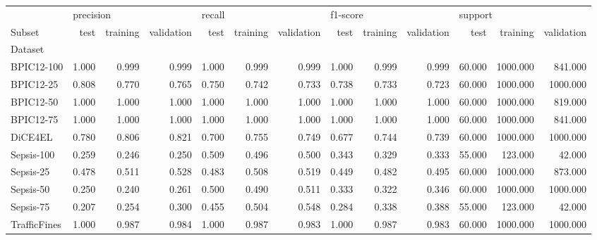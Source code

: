 \begin{tabular}{lrrrrrrrrrrrr}
\toprule
 & \multicolumn{3}{l}{precision} & \multicolumn{3}{l}{recall} & \multicolumn{3}{l}{f1-score} & \multicolumn{3}{l}{support} \\
Subset & test & training & validation & test & training & validation & test & training & validation & test & training & validation \\
Dataset &  &  &  &  &  &  &  &  &  &  &  &  \\
\midrule
BPIC12-100 & 1.000 & 0.999 & 0.999 & 1.000 & 0.999 & 0.999 & 1.000 & 0.999 & 0.999 & 60.000 & 1000.000 & 841.000 \\
BPIC12-25 & 0.808 & 0.770 & 0.765 & 0.750 & 0.742 & 0.733 & 0.738 & 0.733 & 0.723 & 60.000 & 1000.000 & 1000.000 \\
BPIC12-50 & 1.000 & 1.000 & 1.000 & 1.000 & 1.000 & 1.000 & 1.000 & 1.000 & 1.000 & 60.000 & 1000.000 & 819.000 \\
BPIC12-75 & 1.000 & 1.000 & 1.000 & 1.000 & 1.000 & 1.000 & 1.000 & 1.000 & 1.000 & 60.000 & 1000.000 & 841.000 \\
DiCE4EL & 0.780 & 0.806 & 0.821 & 0.700 & 0.755 & 0.749 & 0.677 & 0.744 & 0.739 & 60.000 & 1000.000 & 1000.000 \\
Sepsis-100 & 0.259 & 0.246 & 0.250 & 0.509 & 0.496 & 0.500 & 0.343 & 0.329 & 0.333 & 55.000 & 123.000 & 42.000 \\
Sepsis-25 & 0.478 & 0.511 & 0.528 & 0.483 & 0.508 & 0.519 & 0.449 & 0.482 & 0.495 & 60.000 & 1000.000 & 873.000 \\
Sepsis-50 & 0.250 & 0.240 & 0.261 & 0.500 & 0.490 & 0.511 & 0.333 & 0.322 & 0.346 & 60.000 & 1000.000 & 1000.000 \\
Sepsis-75 & 0.207 & 0.254 & 0.300 & 0.455 & 0.504 & 0.548 & 0.284 & 0.338 & 0.388 & 55.000 & 123.000 & 42.000 \\
TrafficFines & 1.000 & 0.987 & 0.984 & 1.000 & 0.987 & 0.983 & 1.000 & 0.987 & 0.983 & 60.000 & 1000.000 & 1000.000 \\
\bottomrule
\end{tabular}
